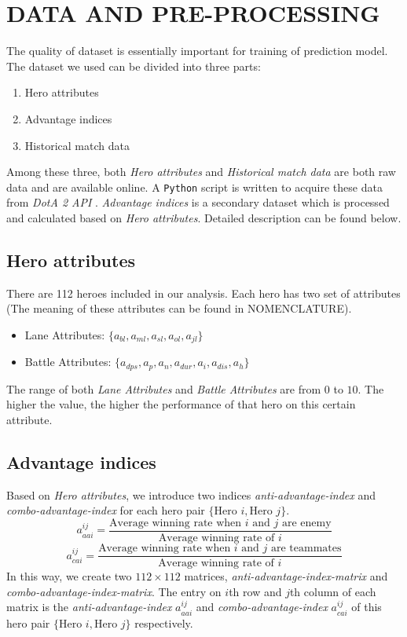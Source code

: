 \documentclass[letterpaper, 10 pt, conference]{ieeeconf}  %
\begin{document}
\section{DATA AND PRE-PROCESSING}

The quality of dataset is essentially important for training  of prediction model. The dataset we used can be divided into three parts: 
\begin{enumerate}
\item Hero attributes
\item Advantage indices
\item Historical match data
\end{enumerate}
Among these three, both \textit{Hero attributes} and \textit{Historical match data} are both raw data and are available online. A \texttt{Python} script is written to acquire these data from \textit{DotA 2 API} \cite{c1}. \textit{Advantage indices} is a secondary dataset which is processed and  calculated based on \textit{Hero attributes}. Detailed description can be found below.
\subsection{Hero attributes}
There are 112 heroes included in our analysis. Each hero has two set of attributes (The meaning of these attributes can be found in NOMENCLATURE).
\begin{itemize}
\item Lane Attributes: $\{a_{bl}, a_{ml}, a_{sl}, a_{ol}, a_{jl}\}$
\item Battle Attributes: $\{a_{dps}, a_{p}, a_{n}, a_{dur}, a_{i}, a_{dis}, a_{h}\}$
\end{itemize}
The range of both \textit{Lane Attributes} and \textit{Battle Attributes} are from $0$ to $10$. The higher the value, the higher the performance of that hero on this certain attribute.

\subsection{Advantage indices}
Based on \textit{Hero attributes}, we introduce two indices \textit{anti-advantage-index} and \textit{combo-advantage-index} for each hero pair $\{\text{Hero }i, \text{Hero }j\}$.
$$a_{aai}^{ij}=\frac{\text{Average winning rate when } i \text{ and } j \text{ are enemy}}{\text{Average winning rate of }i}$$
$$a_{cai}^{ij}=\frac{\text{Average winning rate when } i \text{ and } j \text{ are teammates}}{\text{Average winning rate of }i}$$
In this way, we create two $112\times 112$ matrices, \textit{anti-advantage-index-matrix} and \textit{combo-advantage-index-matrix}. The entry on $i$th row and $j$th column of each matrix is the \textit{anti-advantage-index} $a_{aai}^{ij}$ and \textit{combo-advantage-index} $a_{cai}^{ij}$ of this hero pair $\{\text{Hero }i, \text{Hero }j\}$ respectively. 
\end{document}
